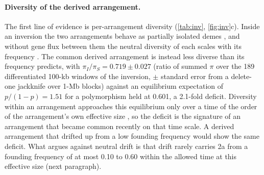 \documentclass[11pt]{article}
\begin{document}
\paragraph{Diversity of the derived arrangement.} The first line of evidence is per-arrangement diversity (\cref{tab:inv},
\cref{fig:inv}c). Inside an inversion the two arrangements behave as partially
isolated demes \citep{navarro2000,guerrero2012}, and without gene flux between them the
neutral diversity of each scales with its frequency \citep{navarro2000,charlesworth2023}. The common derived arrangement is
instead less diverse than its frequency predicts, with $\pi_I/\pi_S=0.719\pm0.027$ (ratio of summed $\pi$ over the 189 differentiated 100-kb windows of the inversion, $\pm$ standard error from a delete-one jackknife over 1-Mb blocks) against an equilibrium expectation of $p/(1-p)=1.51$
for a polymorphism held at 0.601, a 2.1-fold deficit. Diversity within an arrangement approaches this equilibrium
only over a time of the order of the arrangement's own effective size \citep{charlesworth2023}, so the deficit is the signature of an arrangement that became common recently on that time scale. A derived arrangement that drifted up from a low founding frequency would show the same deficit. What argues against neutral drift is that drift rarely carries 2a from a founding frequency of at most 0.10 to 0.60 within the allowed time at this effective size (next paragraph).
\end{document}

